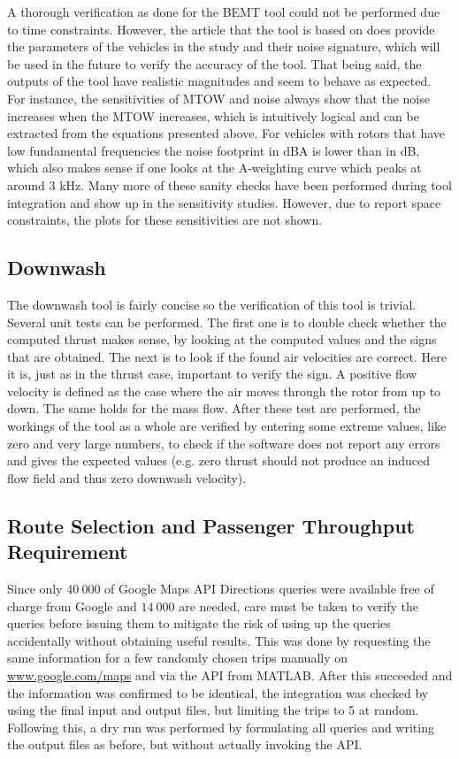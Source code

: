 A thorough verification as done for the BEMT tool could not be performed due to time constraints. However, the article that the tool is based on does provide the parameters of the vehicles in the study and their noise signature, which will be used in the future to verify the accuracy of the tool. That being said, the outputs of the tool have realistic magnitudes and seem to behave as expected. For instance, the sensitivities of MTOW and noise always show that the noise increases when the MTOW increases, which is intuitively logical and can be extracted from the equations presented above. For vehicles with rotors that have low fundamental frequencies the noise footprint in dBA is lower than in dB, which also makes sense if one looks at the A-weighting curve which peaks at around 3 kHz. Many more of these sanity checks have been performed during tool integration and show up in the sensitivity studies. However, due to report space constraints, the plots for these sensitivities are not shown.

\subsection{Downwash} \label{sec:DownwashVerification}

The downwash tool is fairly concise so the verification of this tool is trivial. Several unit tests can be performed. The first one is to double check whether the computed thrust makes sense, by looking at the computed values and the signs that are obtained. The next is to look if the found air velocities are correct. Here it is, just as in the thrust case, important to verify the sign. A positive flow velocity is defined as the case where the air moves through the rotor from up to down. The same holds for the mass flow. After these test are performed, the workings of the tool as a whole are verified by entering some extreme values, like zero and very large numbers, to check if the software does not report any errors and gives the expected values (e.g. zero thrust should not produce an induced flow field and thus zero downwash velocity).   

\subsection{Route Selection and Passenger Throughput Requirement} \label{sec:RouteSelVerification}

Since only $40\ 000$ of Google Maps API Directions queries were available free of charge from Google and $14\ 000$ are needed, care must be taken to verify the queries before issuing them to mitigate the risk of using up the queries accidentally without obtaining useful results. This was done by requesting the same information for a few randomly chosen trips manually on \url{www.google.com/maps} and via the API from MATLAB. After this succeeded and the information was confirmed to be identical, the integration was checked by using the final input and output files, but limiting the trips to 5 at random. Following this, a dry run was performed by formulating all queries and writing the output files as before, but without actually invoking the API. 

